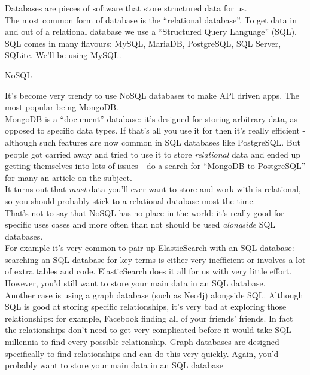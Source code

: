 Databases are pieces of software that store structured data for us.
\\

The most common form of database is the ``relational database''. To get data in and out of a relational database we use a ``Structured Query Language'' (SQL).
\\

SQL comes in many flavours: MySQL, MariaDB, PostgreSQL, SQL Server, SQLite. We'll be using MySQL.


\begin{infobox}{NoSQL}


    It's become very trendy to use NoSQL databases to make API driven apps. The most popular being MongoDB.
    \\

    MongoDB is a ``document'' database: it's designed for storing arbitrary data, as opposed to specific data types. If that's all you use it for then it's really efficient - although such features are now common in SQL databases like PostgreSQL. But people got carried away and tried to use it to store \textit{relational} data and ended up getting themselves into lots of issues - do a search for ``MongoDB to PostgreSQL'' for many an article on the subject.
    \\

    It turns out that \textit{most} data you'll ever want to store and work with is relational, so you should probably stick to a relational database most the time.
    \\

    That's not to say that NoSQL has no place in the world: it's really good for specific uses cases and more often than not should be used \textit{alongside} SQL databases.
    \\

    For example it's very common to pair up ElasticSearch with an SQL database: searching an SQL database for key terms is either very inefficient or involves a lot of extra tables and code. ElasticSearch does it all for us with very little effort. However, you'd still want to store your main data in an SQL database.
    \\

    Another case is using a graph database (such as Neo4j) alongside SQL. Although SQL is good at storing specific relationships, it's very bad at exploring those relationships: for example, Facebook finding all of your friends' friends. In fact the relationships don't need to get very complicated before it would take SQL millennia to find every possible relationship. Graph databases are designed specifically to find relationships and can do this very quickly. Again, you'd probably want to store your main data in an SQL database
\end{infobox}


